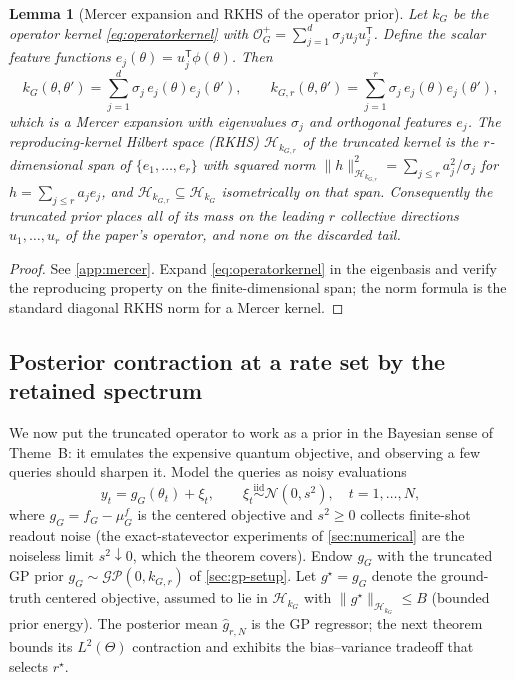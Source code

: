 \documentclass[aps,prxquantum,reprint,amsmath,amssymb,floatfix,nofootinbib,superscriptaddress,longbibliography]{revtex4-2}
\newtheorem{lemma}{Lemma}
\theoremstyle{remark}
\newcommand{\calO}{\mathcal{O}}
\begin{document}
\begin{lemma}[Mercer expansion and RKHS of the operator prior]
\label{lem:mercer}
Let \(k_G\) be the operator kernel \eqref{eq:operatorkernel} with
\(\calO_G^{+}=\sum_{j=1}^{d}\sigma_j u_ju_j^{\mathsf T}\).  Define the scalar
feature functions \(e_j(\theta)=u_j^{\mathsf T}\phi(\theta)\).  Then
\begin{equation}
    k_G(\theta,\theta')=\sum_{j=1}^{d}\sigma_j\,e_j(\theta)e_j(\theta'),
    \qquad
    k_{G,r}(\theta,\theta')=\sum_{j=1}^{r}\sigma_j\,e_j(\theta)e_j(\theta'),
    \label{eq:mercer}
\end{equation}
which is a Mercer expansion with eigenvalues \(\sigma_j\) and orthogonal features
\(e_j\).  The reproducing-kernel Hilbert space (RKHS)
\(\mathcal H_{k_{G,r}}\) of the truncated kernel is the \(r\)-dimensional span of
\(\{e_1,\dots,e_r\}\) with squared norm
\(\|h\|_{\mathcal H_{k_{G,r}}}^2=\sum_{j\le r}a_j^2/\sigma_j\) for
\(h=\sum_{j\le r}a_j e_j\), and \(\mathcal H_{k_{G,r}}\subseteq\mathcal H_{k_G}\)
isometrically on that span.  Consequently the truncated prior places all of its
mass on the leading \(r\) collective directions \(u_1,\dots,u_r\) of the paper's
operator, and none on the discarded tail.
\end{lemma}
\begin{proof}
See \cref{app:mercer}. Expand \eqref{eq:operatorkernel} in the eigenbasis and
verify the reproducing property on the finite-dimensional span; the norm formula
is the standard diagonal RKHS norm for a Mercer kernel.
\end{proof}

\subsection{Posterior contraction at a rate set by the retained spectrum}
\label{sec:contraction}

We now put the truncated operator to work as a prior in the Bayesian sense of
Theme~B: it emulates the expensive quantum objective, and observing a few queries
should sharpen it. Model the queries as noisy evaluations
\begin{equation}
    y_t = g_G(\theta_t) + \xi_t,\qquad \xi_t\stackrel{\text{iid}}{\sim}
    \mathcal N(0,s^2),\quad t=1,\dots,N,
    \label{eq:obsmodel}
\end{equation}
where \(g_G=f_G-\mu_G^{\!f}\) is the centered objective and \(s^2\ge0\) collects
finite-shot readout noise (the exact-statevector experiments of
\cref{sec:numerical} are the noiseless limit \(s^2\downarrow0\), which the theorem
covers).  Endow \(g_G\) with the truncated GP prior
\(g_G\sim\mathcal{GP}(0,k_{G,r})\) of \cref{sec:gp-setup}. Let
\(g^{\star}=g_G\) denote the ground-truth centered objective, assumed to lie in
\(\mathcal H_{k_G}\) with \(\|g^{\star}\|_{\mathcal H_{k_G}}\le B\) (bounded prior
energy). The posterior mean \(\widehat g_{r,N}\) is the GP regressor; the next
theorem bounds its \(L^2(\Theta)\) contraction and exhibits the bias--variance
tradeoff that selects \(r^{\star}\).
\end{document}
